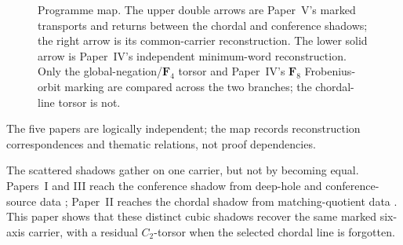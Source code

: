 \documentclass[11pt]{article}
\theoremstyle{definition}
\theoremstyle{remark}
\newcommand{\F}{\mathbf F}
\begin{document}
\begin{figure}[H]
\centering
{}
\caption{Programme map.  The upper double arrows are Paper~V's marked
transports and returns between the chordal and conference shadows; the right
arrow is its common-carrier reconstruction.  The lower solid arrow is
Paper~IV's independent minimum-word reconstruction.  Only the
global-negation/\(\F_4\) torsor and Paper~IV's \(\F_8\) Frobenius-orbit
marking are compared across the two branches; the chordal-line torsor is not.}
\label{fig:programme-map}
\end{figure}

The five papers are logically independent; the map records reconstruction
correspondences and thematic relations, not proof dependencies.

The scattered shadows gather on one carrier, but not by becoming equal.
Papers~I and III reach the conference shadow from deep-hole and
conference-source data \cite{RuddRigidity2026,RuddPassages2026}; Paper~II reaches
the chordal shadow from matching-quotient data
\cite{RuddFactorization2026}.  This paper shows that these distinct cubic
shadows
recover the same marked six-axis carrier, with a residual \(C_2\)-torsor when
the selected chordal line is forgotten.
\end{document}
